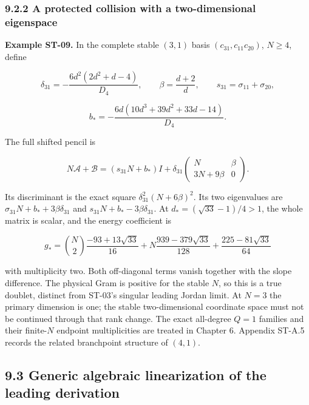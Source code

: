 \documentclass[a4paper,11pt]{article}
\numberwithin{equation}{section}
\begin{document}
\hypertarget{a-protected-collision-with-a-two-dimensional-eigenspace}{%
\subsubsection{9.2.2 A protected collision with a two-dimensional eigenspace}\label{a-protected-collision-with-a-two-dimensional-eigenspace}}

\textbf{Example ST-09.} In the complete stable \((3,1)\) basis \((c_{31},c_{11}c_{20})\), \(N\geq4\), define

\[
\delta_{31}=-\frac{6d^2(2d^2+d-4)}{D_4},\qquad
\beta=\frac{d+2}{d},\qquad s_{31}=\sigma_{11}+\sigma_{20},
\]

\[
b_*=-\frac{6d(10d^3+39d^2+33d-14)}{D_4}.
\]

The full shifted pencil is

\[
N\mathscr A+\mathscr B=
(s_{31}N+b_*)I+
\delta_{31}\begin{pmatrix}N&\beta\\3N+9\beta&0\end{pmatrix}.
\]

Its discriminant is the exact square \(\delta_{31}^2(N+6\beta)^2\). Its two eigenvalues are \(\sigma_{31}N+b_*+3\beta\delta_{31}\) and \(s_{31}N+b_*-3\beta\delta_{31}\). At \(d_*=(\sqrt{33}-1)/4>1\), the whole matrix is scalar, and the energy coefficient is

\[
g_*=\binom N2\frac{-93+13\sqrt{33}}{16}
+N\frac{939-379\sqrt{33}}{128}
+\frac{225-81\sqrt{33}}{64}
\]

with multiplicity two. Both off-diagonal terms vanish together with the slope difference. The physical Gram is positive for the stable \(N\), so this is a true doublet, distinct from ST-03's singular leading Jordan limit. At \(N=3\) the primary dimension is one; the stable two-dimensional coordinate space must not be continued through that rank change. The exact all-degree \(Q=1\) families and their finite-\(N\) endpoint multiplicities are treated in Chapter 6. Appendix ST-A.5 records the related branchpoint structure of \((4,1)\).

\hypertarget{generic-algebraic-linearization-of-the-leading-derivation}{%
\subsection{9.3 Generic algebraic linearization of the leading derivation}\label{generic-algebraic-linearization-of-the-leading-derivation}}
\end{document}
